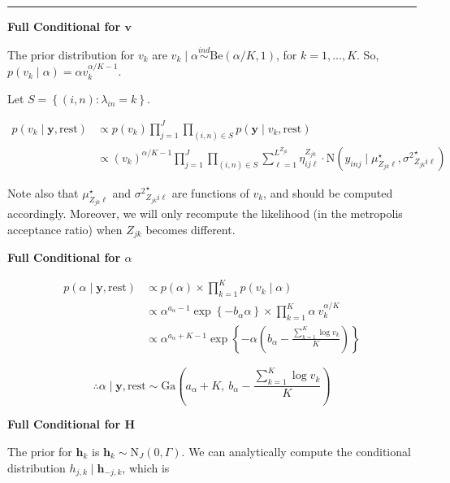 \documentclass[12pt,]{article}
\newcommand{\p}[1]{\left(#1\right)}
\newcommand{\bc}[1]{ \left\{#1\right\} }
\newcommand{\N}{ \mathcal{N} }
\newcommand{\ind}{\overset{ind}{\sim}}
\def\N{\text{N}}
\def\G{\text{Ga}}
\def\Be{\text{Be}}
\def\lin{\lambda_{in}}
\def\y{\bm{y}}
\def\mus{\mu^\star}
\def\sss{{\sigma^2}^\star}
\def\rest{\text{rest}}
\def\h{\bm{h}}
\begin{document}

\vspace{5em}
\hrule
\vspace{5em}

\textbf{Full Conditional for $\bm v$}

The prior distribution for \(v_k\) are
\(v_k \mid \alpha \ind \Be(\alpha/K, 1)\), for \(k = 1,...,K\). So,
\(p(v_k \mid \alpha) = \alpha v_k^{\alpha/K-1}\).

Let \(S = \bc{(i,n)\colon \lin = k}\).

\begin{align*}
p(v_k \mid \y, \rest) &\propto p(v_k) \prod_{j=1}^J\prod_{(i,n)\in S} p(\y \mid v_k, \rest) \\
&\propto (v_k)^{\alpha/K-1} \prod_{j=1}^J \prod_{(i,n)\in S}
\sum_{\ell=1}^{L^{Z_{jk}}} \eta^{Z_{jk}}_{ij\ell} \cdot
\N(y_{inj} \mid \mus_{Z_{jk}\ell}, \sss_{Z_{jk}i\ell})
\end{align*}


Note also that \(\mus_{Z_{jk}\ell}\) and \(\sss_{Z_{jk}i\ell}\) are
functions of \(v_k\), and should be computed accordingly. Moreover, we
will only recompute the likelihood (in the metropolis acceptance ratio)
when \(Z_{jk}\) becomes different.
\vspace{2em}


\textbf{Full Conditional for $\alpha$}

\begin{align*}
p(\alpha \mid \y, \rest) &\propto p(\alpha) \times \prod_{k=1}^K p(v_k \mid \alpha) \\
&\propto \alpha^{a_\alpha - 1} \exp\bc{-b_\alpha \alpha} \times \prod_{k=1}^K 
\alpha~v_k^{\alpha/K} \\
&\propto \alpha^{a_\alpha + K -1} \exp\bc{-\alpha\p{b_\alpha - 
\frac{\sum_{k=1}^K \log v_k}{K}}}
\end{align*}

\[
\therefore \alpha \mid \y, \rest \sim 
\G\p{a_\alpha + K,~ b_\alpha - \frac{\sum_{k=1}^K \log v_k}{K}}
\]
\vspace{2em}


\textbf{Full Conditional for $\bm H$}

The prior for \(\h_k\) is \(\h_k \sim \N_J(0, \Gamma)\). We can
analytically compute the conditional distribution
\(h_{j,k} \mid \h_{-j,k}\), which is
\end{document}
